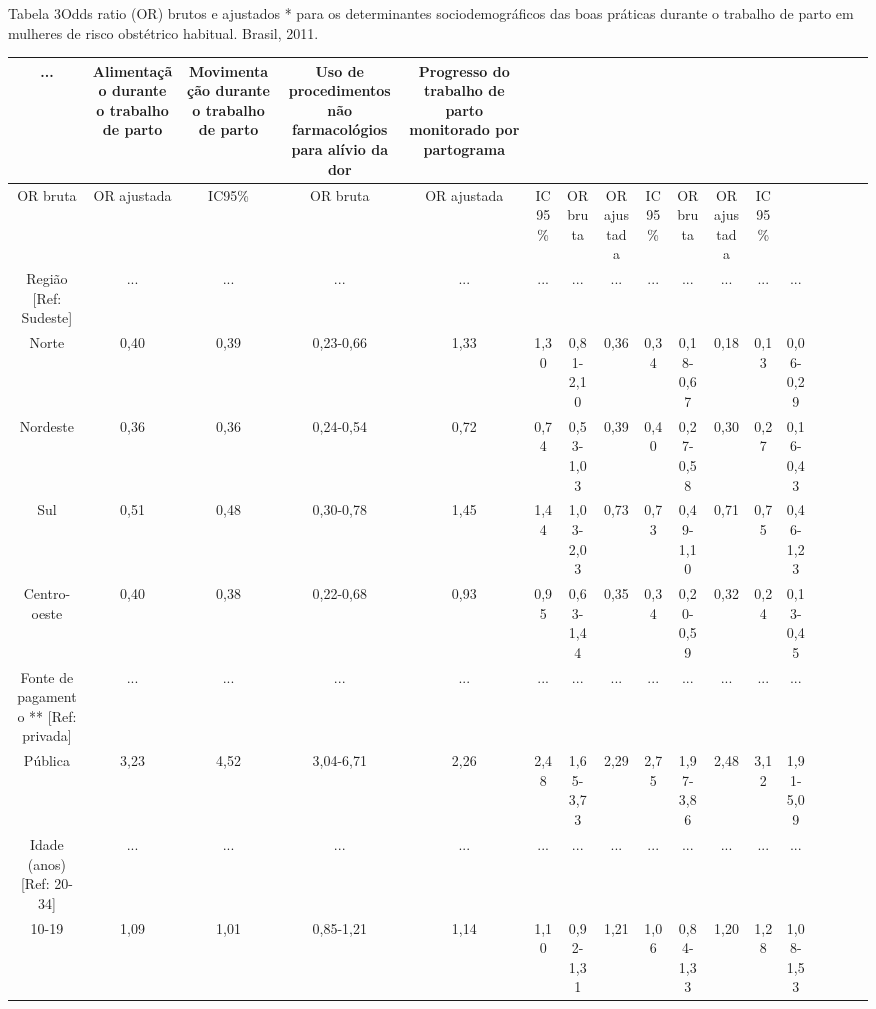 \documentclass{article}
\begin{document}
Tabela 3Odds ratio (OR) brutos e ajustados * para os determinantes
sociodemográficos das boas práticas durante o trabalho de parto em
mulheres de risco obstétrico habitual. Brasil, 2011.\begin{table}
\small\centering
\begin{tabulary}{\linewidth}{ C C C C C C C C C C C C C C C C C }
\hline... & Alimentação durante o trabalho de parto & Movimentação durante o trabalho
de parto & Uso de procedimentos não farmacológios para alívio
da dor & Progresso do trabalho de parto monitorado por
partograma\\ \hline
OR bruta & OR ajustada & IC95\% & OR bruta & OR ajustada & IC95\% & OR bruta &
OR ajustada & IC95\% & OR bruta & OR ajustada & IC95\%\\ \hline
Região [Ref: Sudeste]
& ...
& ...
& ...
& ...
& ...
& ...
& ...
& ...
& ...
& ...
& ...
& ...
\\ \hline

Norte
& 0,40
& 0,39
& 0,23-0,66
& 1,33
& 1,30
& 0,81-2,10
& 0,36
& 0,34
& 0,18-0,67
& 0,18
& 0,13
& 0,06-0,29
\\ \hline

Nordeste
& 0,36
& 0,36
& 0,24-0,54
& 0,72
& 0,74
& 0,53-1,03
& 0,39
& 0,40
& 0,27-0,58
& 0,30
& 0,27
& 0,16-0,43
\\ \hline

Sul
& 0,51
& 0,48
& 0,30-0,78
& 1,45
& 1,44
& 1,03-2,03
& 0,73
& 0,73
& 0,49-1,10
& 0,71
& 0,75
& 0,46-1,23
\\ \hline

Centro-oeste
& 0,40
& 0,38
& 0,22-0,68
& 0,93
& 0,95
& 0,63-1,44
& 0,35
& 0,34
& 0,20-0,59
& 0,32
& 0,24
& 0,13-0,45
\\ \hline

Fonte de pagamento ** [Ref: privada]
& ...
& ...
& ...
& ...
& ...
& ...
& ...
& ...
& ...
& ...
& ...
& ...
\\ \hline

Pública
& 3,23
& 4,52
& 3,04-6,71
& 2,26
& 2,48
& 1,65-3,73
& 2,29
& 2,75
& 1,97-3,86
& 2,48
& 3,12
& 1,91-5,09
\\ \hline

Idade (anos) [Ref: 20-34]
& ...
& ...
& ...
& ...
& ...
& ...
& ...
& ...
& ...
& ...
& ...
& ...
\\ \hline

10-19
& 1,09
& 1,01
& 0,85-1,21
& 1,14
& 1,10
& 0,92-1,31
& 1,21
& 1,06
& 0,84-1,33
& 1,20
& 1,28
& 1,08-1,53
\\ \hline


\end{tabulary}
\end{table}
\end{document}
